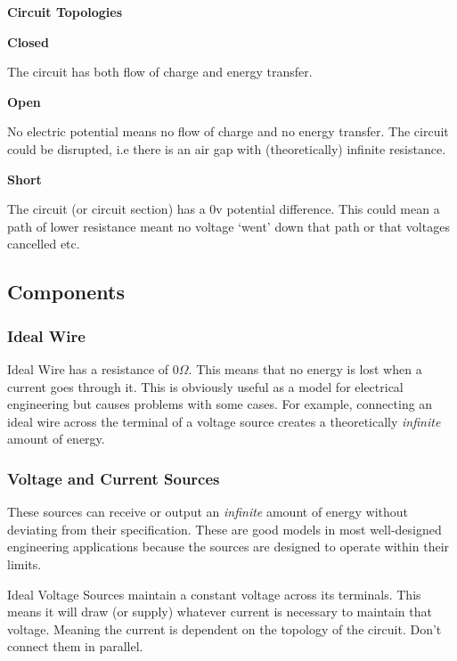 \documentclass[12pt]{article}
\begin{document}
\begin{theorem*}
{\bf Circuit Topologies}
\begin{center}
\textbf{Closed}
\end{center}
The circuit has both flow of charge and energy transfer.

\begin{center}
\textbf{Open}
\end{center}

No electric potential means no flow of charge and no energy transfer. 
The circuit could be disrupted, i.e there is an air gap with (theoretically) infinite resistance.

\begin{center}
\textbf{Short}
\end{center}

The circuit (or circuit section) has a 0v potential difference.
This could mean a path of lower resistance meant no voltage `went' down that path or that voltages cancelled etc.
\end{theorem*}

\subsection{Components}

\subsubsection{Ideal Wire}
Ideal Wire has a resistance of 0$\Omega$. 
This means that no energy is lost when a current goes through it. 
This is obviously useful as a model for electrical engineering but causes problems with some cases.
For example, connecting an ideal wire across the terminal of a voltage source creates a theoretically \textit{infinite} amount of energy.

\subsubsection{Voltage and Current Sources}
These sources can receive or output an \textit{infinite} amount of energy without deviating from their specification.
These are good models in most well-designed engineering applications because the sources are designed to operate within their limits.

Ideal Voltage Sources maintain a constant voltage across its terminals.
This means it will draw (or supply) whatever current is necessary to maintain that voltage.
Meaning the current is dependent on the topology of the circuit.
Don't connect them in parallel.
\end{document}
